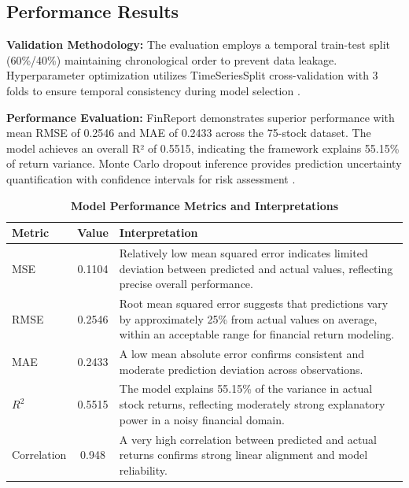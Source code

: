 \documentclass[3p,times,procedia]{elsarticle}
\begin{document}
\subsection{Performance Results}

\textbf{Validation Methodology:} The evaluation employs a temporal train-test split (60\%/40\%) maintaining chronological order to prevent data leakage. Hyperparameter optimization utilizes TimeSeriesSplit cross-validation with 3 folds to ensure temporal consistency during model selection \cite{Kingma2015}.

\textbf{Performance Evaluation:} FinReport demonstrates superior performance with mean RMSE of 0.2546 and MAE of 0.2433 across the 75-stock dataset. The model achieves an overall R² of 0.5515, indicating the framework explains 55.15\% of return variance. Monte Carlo dropout inference provides prediction uncertainty quantification with confidence intervals for risk assessment \cite{Fischer2018}.


\begin{table}[!ht]
\centering
\caption{\textbf{Model Performance Metrics and Interpretations}}
\begin{tabular}{|l|c|l|}
\hline
\textbf{Metric} & \textbf{Value} & \textbf{Interpretation} \\
\hline
MSE         & 0.1104 & \begin{minipage}[t]{8cm}Relatively low mean squared error indicates limited deviation between predicted and actual values, reflecting precise overall performance.\end{minipage} \\[2ex]
RMSE        & 0.2546 & \begin{minipage}[t]{8cm}Root mean squared error suggests that predictions vary by approximately 25\% from actual values on average, within an acceptable range for financial return modeling.\end{minipage} \\[2ex]
MAE         & 0.2433 & \begin{minipage}[t]{8cm}A low mean absolute error confirms consistent and moderate prediction deviation across observations.\end{minipage} \\[2ex]
$R^2$       & 0.5515 & \begin{minipage}[t]{8cm}The model explains 55.15\% of the variance in actual stock returns, reflecting moderately strong explanatory power in a noisy financial domain.\end{minipage} \\[2ex]
Correlation & 0.948  & \begin{minipage}[t]{8cm}A very high correlation between predicted and actual returns confirms strong linear alignment and model reliability.\end{minipage} \\[2ex]
\hline
\end{tabular}
\end{table}
\end{document}
